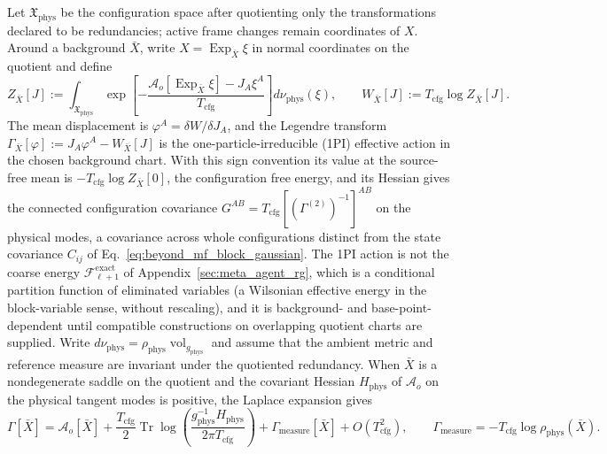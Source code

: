 Let $\mathfrak{X}_{\mathrm{phys}}$ be the configuration space after quotienting only the transformations declared to be redundancies; active frame changes remain coordinates of $X$. Around a background $\bar{X}$, write $X=\operatorname{Exp}_{\bar{X}}\xi$ in normal coordinates on the quotient and define
\begin{equation}
Z_{\bar{X}}[J]
:=\int_{\mathfrak{X}_{\mathrm{phys}}}
\exp\left[-\frac{\mathcal{A}_o[\operatorname{Exp}_{\bar{X}}\xi]-J_A\xi^A}{T_{\mathrm{cfg}}}\right]
d\nu_{\mathrm{phys}}(\xi),
\qquad
W_{\bar{X}}[J]:=T_{\mathrm{cfg}}\log Z_{\bar{X}}[J].
\label{eq:beyond_mf_generating_functional}
\end{equation}
The mean displacement is $\varphi^A=\delta W/\delta J_A$, and the Legendre transform $\Gamma_{\bar{X}}[\varphi]:=J_A\varphi^A-W_{\bar{X}}[J]$ is the one-particle-irreducible (1PI) effective action in the chosen background chart. With this sign convention its value at the source-free mean is $-T_{\mathrm{cfg}}\log Z_{\bar{X}}[0]$, the configuration free energy, and its Hessian gives the connected configuration covariance $G^{AB}=T_{\mathrm{cfg}}[(\Gamma^{(2)})^{-1}]^{AB}$ on the physical modes, a covariance across whole configurations distinct from the state covariance $C_{ij}$ of Eq.~\eqref{eq:beyond_mf_block_gaussian}. The 1PI action is not the coarse energy $\mathcal{F}^{\mathrm{exact}}_{\ell+1}$ of Appendix~\ref{sec:meta_agent_rg}, which is a conditional partition function of eliminated variables (a Wilsonian effective energy in the block-variable sense, without rescaling), and it is background- and base-point-dependent until compatible constructions on overlapping quotient charts are supplied. Write $d\nu_{\mathrm{phys}}=\rho_{\mathrm{phys}}\operatorname{vol}_{g_{\mathrm{phys}}}$ and assume that the ambient metric and reference measure are invariant under the quotiented redundancy. When $\bar{X}$ is a nondegenerate saddle on the quotient and the covariant Hessian $H_{\mathrm{phys}}$ of $\mathcal{A}_o$ on the physical tangent modes is positive, the Laplace expansion gives
\begin{equation}
\Gamma[\bar{X}]
=\mathcal{A}_o[\bar{X}]
+\frac{T_{\mathrm{cfg}}}{2}
\operatorname{Tr}\log\left(\frac{g_{\mathrm{phys}}^{-1}H_{\mathrm{phys}}}{2\pi T_{\mathrm{cfg}}}\right)
+\Gamma_{\mathrm{measure}}[\bar{X}]
+O(T_{\mathrm{cfg}}^2),
\qquad
\Gamma_{\mathrm{measure}}=-T_{\mathrm{cfg}}\log\rho_{\mathrm{phys}}(\bar{X}).
\label{eq:beyond_mf_one_loop}
\end{equation}
